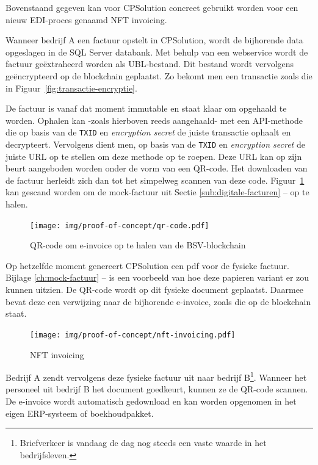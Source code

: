 Bovenstaand gegeven kan voor CPSolution concreet gebruikt worden voor een nieuw EDI-proces genaamd NFT invoicing.

Wanneer bedrijf A een factuur opstelt in CPSolution, wordt de bijhorende data opgeslagen in de SQL Server databank. Met behulp van een webservice wordt de factuur geëxtraheerd worden als UBL-bestand. Dit bestand wordt vervolgens geëncrypteerd op de blockchain geplaatst. Zo bekomt men een transactie zoals die in Figuur~\ref{fig:transactie-encryptie}. 

De factuur is vanaf dat moment immutable en staat klaar om opgehaald te worden. Ophalen kan -zoals hierboven reeds aangehaald- met een API-methode die op basis van de \verb|TXID| en \textit{encryption secret} de juiste transactie ophaalt en decrypteert. Vervolgens dient men, op basis van de \verb|TXID| en \textit{encryption secret} de juiste URL op te stellen om deze methode op te roepen. Deze URL kan op zijn beurt aangeboden worden onder de vorm van een QR-code. Het downloaden van de factuur herleidt zich dan tot het simpelweg scannen van deze code. Figuur~\ref{fig:qr-code} kan gescand worden om de mock-factuur uit Sectie \ref{sub:digitale-facturen} --  op te halen.

\begin{figure}[H]
	\centering
	\texttt{[image: img/proof-of-concept/qr-code.pdf]}
	\caption{\label{fig:qr-code}QR-code om e-invoice op te halen van de BSV-blockchain}
\end{figure}

Op hetzelfde moment genereert CPSolution een pdf voor de fysieke factuur. Bijlage \ref{ch:mock-factuur} --  is een voorbeeld van hoe deze papieren variant er zou kunnen uitzien. De QR-code wordt op dit fysieke document geplaatst. Daarmee bevat deze een verwijzing naar de bijhorende e-invoice, zoals die op de blockchain staat.

\begin{figure}[H]
	\centering
	\texttt{[image: img/proof-of-concept/nft-invoicing.pdf]}
	\caption{\label{fig:nft-invoicing}NFT invoicing}
\end{figure}

Bedrijf A zendt vervolgens deze fysieke factuur uit naar bedrijf B\footnote{Briefverkeer is vandaag de dag nog steeds een vaste waarde in het bedrijfsleven.}. Wanneer het personeel uit bedrijf B het document goedkeurt, kunnen ze de QR-code scannen. De e-invoice wordt automatisch gedownload en kan worden opgenomen in het eigen ERP-systeem of boekhoudpakket. 

